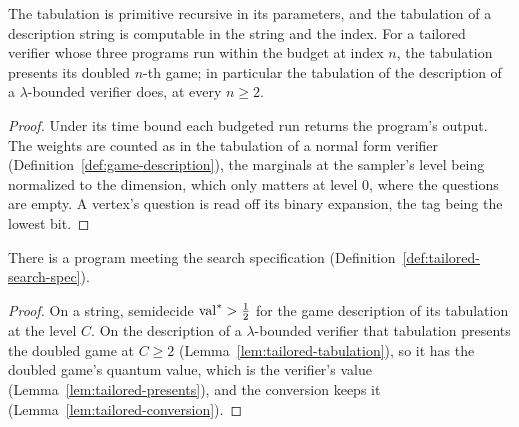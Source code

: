 \begin{lemma}
\label{lem:tailored-tabulation}
\leanok
The tabulation is primitive recursive in its parameters, and the tabulation of a description
string is computable in the string and the index. For a tailored verifier whose three programs
run within the budget at index $n$, the tabulation presents its doubled $n$-th game; in
particular the tabulation of the description of a $\lambda$-bounded verifier does, at every
$n \geq 2$.
\end{lemma}

\begin{proof}
\leanok
Under its time bound each budgeted run returns the program's output. The weights are counted as
in the tabulation of a normal form verifier (Definition~\ref{def:game-description}), the
marginals at the sampler's level being normalized to the dimension, which only matters at level
$0$, where the questions are empty. A vertex's question is read off its binary expansion, the tag
being the lowest bit.
\end{proof}

\begin{lemma}
\label{lem:tailored-search}
\leanok
There is a program meeting the search specification (Definition~\ref{def:tailored-search-spec}).
\end{lemma}

\begin{proof}
\leanok
On a string, semidecide $\mathrm{val}^* > \frac12$ for the game description of its tabulation at the
level $C$. On the description of a $\lambda$-bounded verifier that tabulation presents the
doubled game at $C \geq 2$ (Lemma~\ref{lem:tailored-tabulation}), so it has the doubled game's
quantum value, which is the verifier's value (Lemma~\ref{lem:tailored-presents}), and the
conversion keeps it (Lemma~\ref{lem:tailored-conversion}).
\end{proof}


